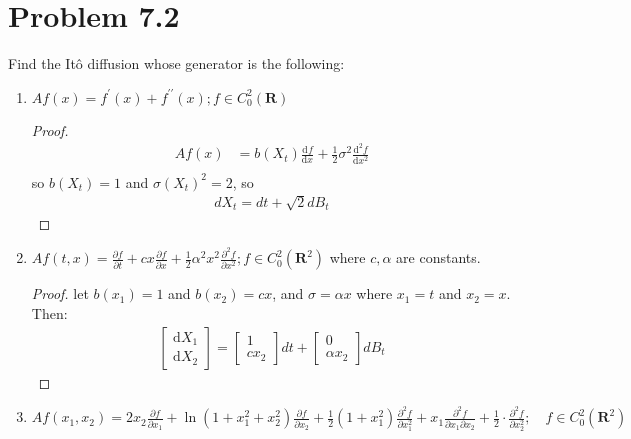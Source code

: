 \documentclass[11pt]{article}
\newcommand{\ga}{\alpha}
\newcommand{\gs}{\sigma}
\newcommand{\mrm}{\mathrm}
\newcommand{\diff}{\mrm{d}}
\newcommand{\deriv}[3][]{%
  \ensuremath{\frac{\diff^{#1} {#2}}{\diff {#3}^{#1}}}}
\begin{document}
 \section*{Problem 7.2}
 Find the It\^o diffusion whose generator is the following:
 \begin{enumerate}
 \item $A f ( x ) = f ^ { \prime } ( x ) + f ^ { \prime \prime } ( x ) ; f \in C _ { 0 } ^ { 2 } ( \mathbf { R } )$
 \begin{proof}
 \begin{align*}
 Af(x) &= b(X_t) \deriv{f}{x} + \frac{1}{2}\gs^2 \deriv[2]{f}{x}\\
 \end{align*}
 so $b(X_t)=1$ and $\gs(X_t)^2 = 2$, so 
 \begin{align*}
 dX_t = dt + \sqrt{2} dB_t
 \end{align*}
 \end{proof}
 \item $A f ( t , x ) = \frac { \partial f } { \partial t } + c x \frac { \partial f } { \partial x } + \frac { 1 } { 2 } \alpha ^ { 2 } x ^ { 2 } \frac { \partial ^ { 2 } f } { \partial x ^ { 2 } } ; f \in C _ { 0 } ^ { 2 } \left( \mathbf { R } ^ { 2 } \right)$ where $c,\ga$ are constants.
 \begin{proof} let $b(x_1) = 1$ and $b(x_2) = cx$, and $\gs=\ga x$ where $x_1=t$ and $x_2=x$.  Then:
 \begin{align*}
 \begin{bmatrix}
 \diff X_1 \\ \diff X_2 
 \end{bmatrix} =
 \begin{bmatrix}
 1 \\ c x_2
 \end{bmatrix} dt +
 \begin{bmatrix}
 0 \\ \ga x_2
 \end{bmatrix} dB_t
 \end{align*}
 \end{proof}
 \item $A f \left( x _ { 1 } , x _ { 2 } \right) = 2 x _ { 2 } \frac { \partial f } { \partial x _ { 1 } } + \ln \left( 1 + x _ { 1 } ^ { 2 } + x _ { 2 } ^ { 2 } \right) \frac { \partial f } { \partial x _ { 2 } }+ \frac { 1 } { 2 } \left( 1 + x _ { 1 } ^ { 2 } \right) \frac { \partial ^ { 2 } f } { \partial x _ { 1 } ^ { 2 } } + x _ { 1 } \frac { \partial ^ { 2 } f } { \partial x _ { 1 } \partial x _ { 2 } } + \frac { 1 } { 2 } \cdot \frac { \partial ^ { 2 } f } { \partial x _ { 2 } ^ { 2 } } ; \quad f \in C _ { 0 } ^ { 2 } \left( \mathbf { R } ^ { 2 } \right)$

\end{enumerate}
\end{document}
